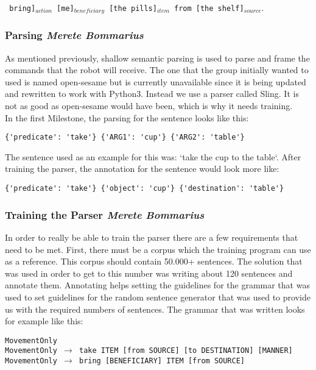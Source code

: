 \documentclass[main.tex]{subfiles}
\begin{document}
            \texttt{ bring]$_{action}$  [me]$_{beneficiary}$ [the pills]$_{item}$ from [the shelf]$_{source}.$}
        \subsubsection{Parsing \small{\textit{Merete Bommarius}}}     
            As mentioned previously, shallow semantic parsing is used to parse and frame the commands that the robot will receive. The one that the group initially wanted to used is named open-sesame but is currently unavailable since it is being updated and rewritten to work with Python3. Instead we use a parser called Sling. It is not as good as open-sesame would have been, which is why it needs training.\\ 
            In the first Milestone, the parsing for the sentence looks like this:
    
\begin{lstlisting}
{'predicate': 'take'} {'ARG1': 'cup'} {'ARG2': 'table'}
\end{lstlisting}
            
            The sentence used as an example for this was: ‘take the cup to the table‘. After training the parser, the annotation for the sentence would look more like:
            
\begin{lstlisting}
{'predicate': 'take'} {'object': 'cup'} {'destination': 'table'}
\end{lstlisting}
            
        \subsubsection{Training the Parser \small{\textit{Merete Bommarius}}}
            In order to really be able to train the parser there are a few requirements that need to be met. First, there must be a corpus which the training program can use as a reference. This corpus should contain 50.000+ sentences. The solution that was used in order to get to this number was writing about 120 sentences and annotate them. Annotating helps setting the guidelines for the grammar that was used to set guidelines for the random sentence generator that was used to provide us with the required numbers of sentences.
            The grammar that was written looks for example like this:
            
            
\texttt{MovementOnly\\
                MovementOnly $\rightarrow$ take ITEM [from SOURCE] [to DESTINATION] [MANNER]\\
                MovementOnly $\rightarrow$ bring [BENEFICIARY] ITEM [from SOURCE]}
                
\end{document}
